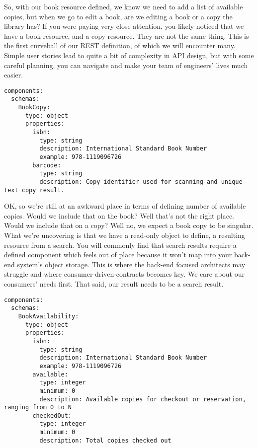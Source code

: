 So, with our book resource defined, we know we need to add a list of available copies, but when we go to edit a book, are we editing a book or a copy the library has?  If you were paying very close attention, you likely noticed that we have a book resource, and a copy resource.  They are not the same thing.  This is the first curveball of our REST definition, of which we will encounter many.  Simple user stories lead to quite a bit of complexity in API design, but with some careful planning, you can navigate and make your team of engineers' lives much easier.

\begin{minipage}{\linewidth}
\begin{code}
\begin{lstlisting}[belowskip=-\baselineskip]
components:
  schemas:
    BookCopy:
      type: object
      properties:
        isbn:
          type: string
          description: International Standard Book Number
          example: 978-1119096726
        barcode:
          type: string
          description: Copy identifier used for scanning and unique text copy result.
\end{lstlisting}
\end{code}
\end{minipage}

OK, so we're still at an awkward place in terms of defining number of available copies.  Would we include that on the book?  Well that's not the right place.  Would we include that on a copy?  Well no, we expect a book copy to be singular.  What we're uncovering is that we have a read-only object to define, a resulting resource from a search.  You will commonly find that search results require a defined component which feels out of place because it won't map into your back-end system's object storage.  This is where the back-end focused architects may struggle and where consumer-driven-contracts becomes key.  We care about our consumers' needs first.  That said, our result needs to be a search result.

\begin{minipage}{\linewidth}
\begin{code}
\begin{lstlisting}[belowskip=-\baselineskip]
components:
  schemas:
    BookAvailability:
      type: object
      properties:
        isbn:
          type: string
          description: International Standard Book Number
          example: 978-1119096726
        available:
          type: integer
          minimum: 0
          description: Available copies for checkout or reservation, ranging from 0 to N
        checkedOut:
          type: integer
          minimum: 0
          description: Total copies checked out
\end{lstlisting}
\end{code}
\end{minipage}

